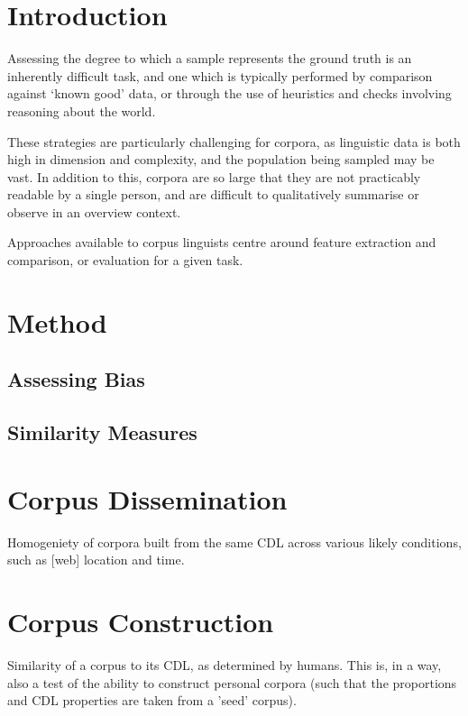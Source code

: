 \section{Introduction}
Assessing the degree to which a sample represents the ground truth is an inherently difficult task, and one which is typically performed by comparison against `known good' data, or through the use of heuristics and checks involving reasoning about the world.

These strategies are particularly challenging for corpora, as linguistic data is both high in dimension and complexity, and the population being sampled may be vast.  In addition to this, corpora are so large that they are not practicably readable by a single person, and are difficult to qualitatively summarise or observe in an overview context.

Approaches available to corpus linguists centre around feature extraction and comparison, or evaluation for a given task.  






\section{Method}
\subsection{Assessing Bias}

\subsection{Similarity Measures}







\section{Corpus Dissemination}
Homogeniety of corpora built from the same CDL across various likely conditions, such as [web] location and time.


\section{Corpus Construction}
Similarity of a corpus to its CDL, as determined by humans.  This is, in a way, also a test of the ability to construct personal corpora (such that the proportions and CDL properties are taken from a 'seed' corpus).





